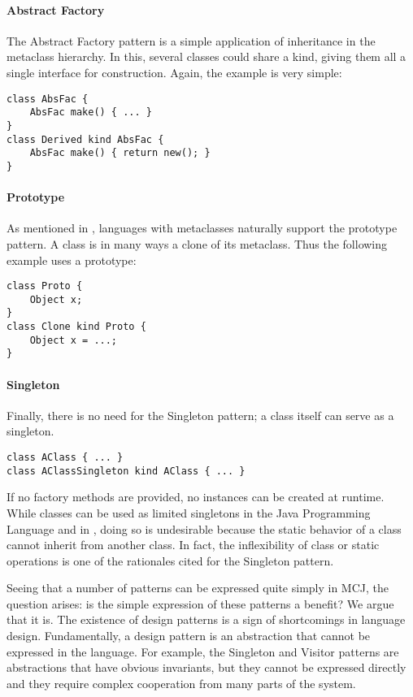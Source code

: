 \documentclass[nocopyrightspace,10pt]{acm-sigplan}
\begin{document}
\paragraph{Abstract Factory}
 The Abstract Factory pattern is a simple application of
inheritance in the metaclass hierarchy.  In this, several classes
could share a kind, giving them all a single interface for
construction. Again, the example is very simple:
\begin{verbatim}
class AbsFac {
    AbsFac make() { ... }
}
class Derived kind AbsFac {
    AbsFac make() { return new(); }
}
\end{verbatim}


\paragraph{Prototype}
As mentioned in \cite{GOF}, languages with metaclasses naturally
support the prototype pattern.  A class is in many ways a clone of its
metaclass.  Thus the following example uses a prototype:
\begin{verbatim}
class Proto {
    Object x;
}
class Clone kind Proto {
    Object x = ...;
}
\end{verbatim}

\paragraph{Singleton}
Finally, there is no need for the Singleton pattern; a
class itself can serve as a singleton. 
\begin{verbatim}
class AClass { ... }
class AClassSingleton kind AClass { ... }
\end{verbatim}
If no factory methods are
provided, no instances can be created at runtime.  While classes can
be used as limited singletons in the Java Programming Language and in
\Cpp, doing so is undesirable because the static behavior of a class
cannot inherit from another class.  In fact, the inflexibility of
class or static operations is one of the rationales cited for the
Singleton pattern.

Seeing that a number of patterns can be expressed quite simply in MCJ,
the question arises: is the simple expression of these patterns a
benefit?  We argue that it is.  The existence of design patterns is a
sign of shortcomings in language design.  Fundamentally, a design
pattern is an abstraction that cannot be expressed in the language.
For example, the Singleton and Visitor patterns are abstractions that
have obvious invariants, but they cannot be expressed directly and
they require complex cooperation from many parts of the system.
\end{document}
